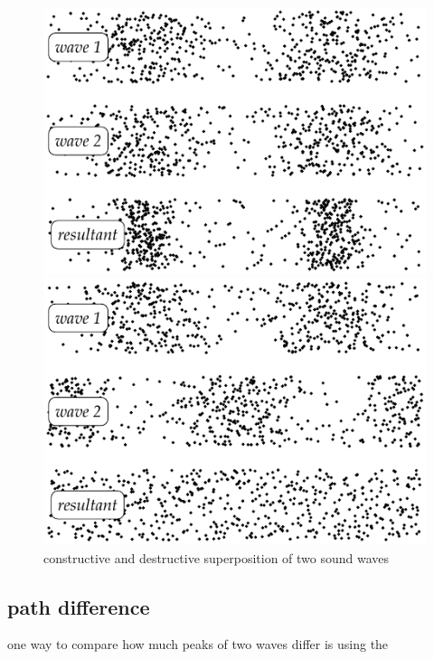 \begin{figure}[htp]
	\centering
	\noindent\begin{minipage}{0.5\linewidth}
		\centering
		\includegraphics[width=.95\textwidth]{longitudinal+I.pdf}
	\end{minipage}\hfil
	\begin{minipage}{0.5\linewidth}
		\centering
		\includegraphics[width=.95\textwidth]{longitudinal-I.pdf}
	\end{minipage}
	\caption*{constructive and destructive superposition of two sound waves} 
\end{figure}



\subsection{path difference}

one way to compare how much peaks of two waves differ is using the 

